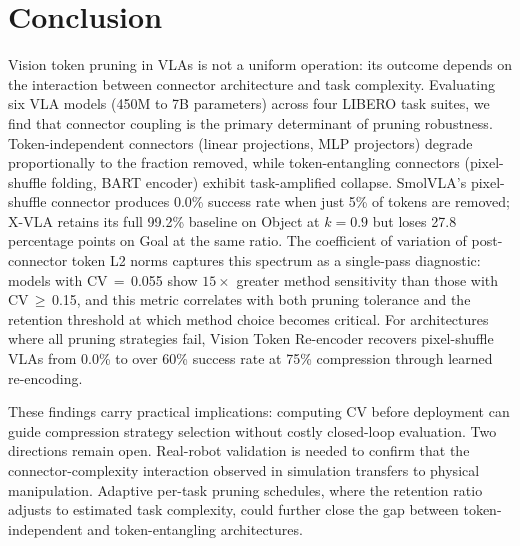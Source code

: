 \section{Conclusion}
\label{sec:conclusion}

Vision token pruning in VLAs is not a uniform operation: its outcome depends on the interaction between connector architecture and task complexity. Evaluating six VLA models (450M to 7B parameters) across four LIBERO task suites, we find that connector coupling is the primary determinant of pruning robustness. Token-independent connectors (linear projections, MLP projectors) degrade proportionally to the fraction removed, while token-entangling connectors (pixel-shuffle folding, BART encoder) exhibit task-amplified collapse. SmolVLA's pixel-shuffle connector produces 0.0\% success rate when just 5\% of tokens are removed; X-VLA retains its full 99.2\% baseline on Object at $k{=}0.9$ but loses 27.8 percentage points on Goal at the same ratio. The coefficient of variation of post-connector token L2 norms captures this spectrum as a single-pass diagnostic: models with CV$\,{=}\,$0.055 show $15{\times}$ greater method sensitivity than those with CV$\,{\geq}\,$0.15, and this metric correlates with both pruning tolerance and the retention threshold at which method choice becomes critical. For architectures where all pruning strategies fail, Vision Token Re-encoder recovers pixel-shuffle VLAs from 0.0\% to over 60\% success rate at 75\% compression through learned re-encoding.

These findings carry practical implications: computing CV before deployment can guide compression strategy selection without costly closed-loop evaluation. Two directions remain open. Real-robot validation is needed to confirm that the connector-complexity interaction observed in simulation transfers to physical manipulation. Adaptive per-task pruning schedules, where the retention ratio adjusts to estimated task complexity, could further close the gap between token-independent and token-entangling architectures.
